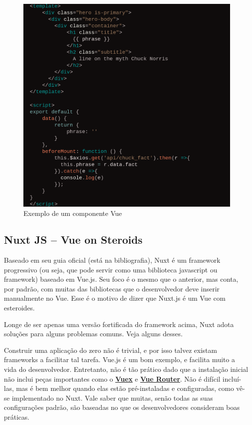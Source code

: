 \begin{figure}[htb]
    \centering
    \includegraphics[width=.7\textwidth]{figuras/vue_template.png}
    \caption{Exemplo de um componente Vue}
    \label{fig:vue-example}
\end{figure}

\subsection[Nuxt JS]{Nuxt JS -- Vue on Steroids}\label{subsec:nuxt-js}

Baseado em seu guia oficial (está na bibliografia), Nuxt é um framework progressivo (ou seja, que
pode servir como uma biblioteca javascript ou framework) baseado em Vue.js. Seu foco é o mesmo que
o anterior, mas conta, por padrão, com muitas das bibliotecas que o desenvolvedor deve inserir 
manualmente no Vue. Esse é o motivo de dizer que Nuxt.js é um Vue com esteroides.

Longe de ser apenas uma versão fortificada do framework acima, Nuxt adota soluções para alguns
problemas comuns. Veja alguns desses.

Construir uma aplicação do zero não é trivial, e por isso talvez existam frameworks a facilitar tal
tarefa. Vue.js é um bom exemplo, e facilita muito a vida do desenvolvedor. Entretanto, não é tão
prático dado que a instalação inicial não inclui peças importantes como o
\href{https://vuex.vuejs.org/}{\textbf{Vuex}} e \href{https://router.vuejs.org/}{\textbf{Vue Router}}.
Não é difícil incluí-las, mas é bem melhor quando elas estão pré-instaladas e configuradas,
como vê-se implementado no Nuxt. Vale saber que muitas, senão todas as suas configurações padrão, são
baseadas no que os desenvolvedores consideram boas práticas.

